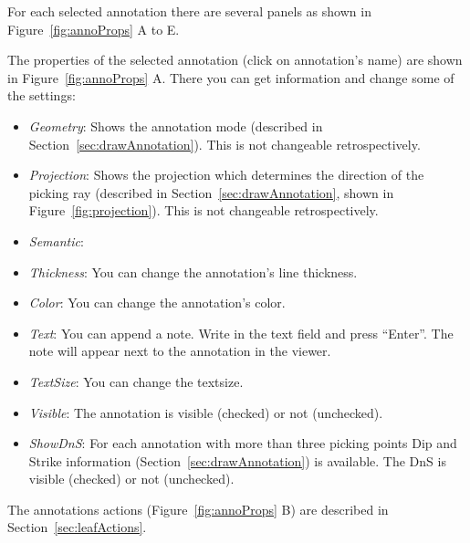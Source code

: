 For each selected annotation there are several panels as shown in Figure~\ref{fig:annoProps} A to E. 

The properties of the selected annotation (click on annotation's name) are shown in Figure~\ref{fig:annoProps} A. There you can get information and change some of the settings:
\begin{itemize}
	\item \textit{Geometry}: Shows the annotation mode (described in Section~\ref{sec:drawAnnotation}). This is not changeable retrospectively.
	\item \textit{Projection}: Shows the projection which determines the direction of the picking ray (described in Section~\ref{sec:drawAnnotation}, shown in Figure~\ref{fig:projection}). This is not changeable retrospectively.
	\item \textit{Semantic}: 
	\item \textit{Thickness}: You can change the annotation's line thickness.
	\item \textit{Color}: You can change the annotation's color.
	\item \textit{Text}: You can append a note. Write in the text field and press ``Enter''. The note will appear next to the annotation in the viewer. 
	\item \textit{TextSize}: You can change the textsize.
	\item \textit{Visible}: The annotation is visible (checked) or not (unchecked).
	\item \textit{ShowDnS}: For each annotation with more than three picking points Dip and Strike information (Section~\ref{sec:drawAnnotation}) is available. The DnS is visible (checked) or not (unchecked).
\end{itemize}

The annotations actions (Figure~\ref{fig:annoProps} B) are described in Section~\ref{sec:leafActions}.\\

